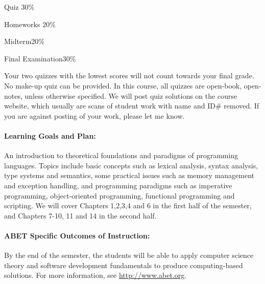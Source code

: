 \documentclass[11pt, epsfig]{article}
\begin{document}
Quiz \hfill 30\%

Homeworks \hfill 20\%

Midterm\hfill 20\% 

Final Examination\hfill 30\% 

Your two quizzes with the lowest scores will not count towards your final grade. 
No make-up quiz can  be provided.
In this course, all quizzes are open-book,
open-notes, unless otherwise specified.  
We will post quiz solutions on the course website, which usually
are scans of  student work with name and ID\# removed.
If you are against posting of your work, please let me know.




\paragraph{Learning Goals and Plan:}  
An introduction to theoretical foundations and paradigms
of programming languages. Topics include basic concepts such as 
lexical analysis, syntax analysis, 
type systems and semantics,
some practical
issues such as  memory management and exception
handling, and  programming paradigms such as imperative
programming, object-oriented programming, 
functional programming and scripting. 
We will cover Chapters 1,2,3,4 and 6 
in the first half of the semester, and Chapters 7-10, 11 and 14
in the second half. 

\paragraph{ABET Specific Outcomes of Instruction:}
By the end of the semester, the students will be able to
apply computer science theory and software development fundamentals to produce computing-based solutions. 
For more information, see \url{http://www.abet.org}.


\end{document}
